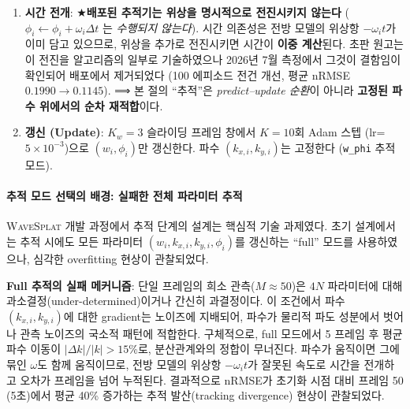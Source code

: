 \documentclass[11pt]{report}
\numberwithin{equation}{chapter}
\numberwithin{figure}{chapter}
\numberwithin{table}{chapter}
\newcommand{\WS}{\textsc{WaveSplat}}
\begin{document}
\begin{enumerate}
  \item \textbf{시간 전개}: ★\textbf{배포된 추적기는 위상을 명시적으로 전진시키지 않는다}
    ($\phi_i \leftarrow \phi_i + \omega_i \Delta t$ 는 \emph{수행되지 않는다}).
    시간 의존성은 전방 모델의 위상항 $-\omega_i t$가 이미 담고 있으므로, 위상을 추가로
    전진시키면 시간이 \textbf{이중 계산}된다. 초판 원고는 이 전진을 알고리즘의 일부로
    기술하였으나 2026년 7월 측정에서 그것이 결함임이 확인되어 배포에서 제거되었다
    (100 에피소드 전건 개선, 평균 nRMSE $0.1990 \to 0.1145$).
    ⟹ 본 절의 ``추적''은 \emph{predict--update 순환}이 아니라
    \textbf{고정된 파수 위에서의 순차 재적합}이다.

  \item \textbf{갱신 (Update)}: $K_w = 3$ 슬라이딩 프레임 창에서
    $K = 10$회 Adam 스텝 (lr=$5\times 10^{-3}$)으로
    $(w_i, \phi_i)$만 갱신한다.
    파수 $(k_{x,i}, k_{y,i})$는 고정한다 (\texttt{w\_phi} 추적 모드).
\end{enumerate}

\paragraph{추적 모드 선택의 배경: 실패한 전체 파라미터 추적}
\WS{} 개발 과정에서 추적 단계의 설계는 핵심적 기술 과제였다.
초기 설계에서는 추적 시에도 모든 파라미터 $(w_i, k_{x,i}, k_{y,i}, \phi_i)$를
갱신하는 ``full'' 모드를 사용하였으나, 심각한 overfitting 현상이 관찰되었다.

\textbf{Full 추적의 실패 메커니즘}:
단일 프레임의 희소 관측($M \approx 50$)은 $4N$ 파라미터에 대해
과소결정(under-determined)이거나 간신히 과결정이다.
이 조건에서 파수 $(k_{x,i}, k_{y,i})$에 대한 gradient는 노이즈에 지배되어,
파수가 물리적 파도 성분에서 벗어나 관측 노이즈의 국소적 패턴에 적합한다.
구체적으로, full 모드에서 5 프레임 후 평균 파수 이동이
$|\Delta k| / |k| > 15\%$로, 분산관계와의 정합이 무너진다.
파수가 움직이면 그에 묶인 $\omega$도 함께 움직이므로, 전방 모델의 위상항
$-\omega_i t$가 잘못된 속도로 시간을 전개하고 오차가 프레임을 넘어 누적된다.
결과적으로 nRMSE가 초기화 시점 대비 프레임 50 (5초)에서 평균 40\% 증가하는
추적 발산(tracking divergence) 현상이 관찰되었다.
\end{document}
